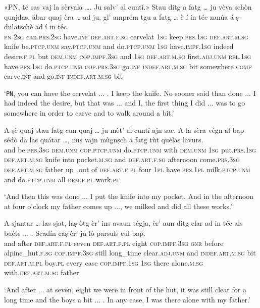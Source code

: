 \begin{linenumbers}
	\gll «PN, té sas vaj la sèrvala …. Ju salv’ al cuntí.»  Stau ditg a fatg … ju vèva schòn quajdas, ábar quaj èra … ad ju,  gl’ amprém tgu a fatg … è í in téc zanúa á ṣ-dulatschè ad í in téc.   \\
	\textsc{pn} \textsc{2sg} can.\textsc{prs.2sg} have.\textsc{inf} \textsc{def.art.f.sg} cervelat {} \textsc{1sg} keep.\textsc{prs.1sg} \textsc{def.art.m.sg} knife be.\textsc{ptcp.unm} say.\textsc{ptcp.unm} and do.\textsc{ptcp.unm} {} \textsc{1sg} have.\textsc{impf.1sg} indeed desire.\textsc{f.pl} but \textsc{dem.unm} \textsc{cop.impf.3sg} {} and \textsc{1sg} \textsc{def.art.m.sg} first.\textsc{adj.unm} \textsc{rel.1sg} have.\textsc{prs.1sg} do.\textsc{ptcp.unm} {} \textsc{cop.prs.3sg} go.\textsc{inf} i\textsc{ndef.art.m.sg} bit somewhere \textsc{comp} carve.\textsc{inf} and go.\textsc{inf} \textsc{indef.art.m.sg} bit  \\
\end{linenumbers}
\medskip
\glt `\texttt{PN}, you can have the cervelat ... . I keep the knife. No sooner said than done ... I had indeed the desire, but that was ... and I, the first thing I did ... was to go somewhere in order to carve and to walk around a bit.'
\medskip

\begin{linenumbers}
	\gll  A ṣè quaj stau fatg cun quaj … ju mèt’ al cuntí ajn sac. A la sèra végn al bap sédò da las quátar …, nuṣ vajn mùgnṣch a fatg tùt quèlas lavurs.\\
	and be.\textsc{prs.3sg} \textsc{dem.unm} \textsc{cop.ptcp.unm} do.\textsc{ptcp.unm} with \textsc{dem.unm} {} \textsc{1sg} put.\textsc{prs.1sg} \textsc{def.art.m.sg} knife into pocket.\textsc{m.sg} and \textsc{def.art.f.sg} afternoon come.\textsc{prs.3sg} \textsc{def.art.m.sg} father up\_out of \textsc{def.art.f.pl} four {} \textsc{1pl} have.\textsc{prs.1pl} milk.\textsc{ptcp.unm} and do.\textsc{ptcp.unm} all \textsc{dem.f.pl} work.\textsc{pl}   \\
\end{linenumbers}
\medskip
\glt `And then this was done ... I put the knife into my pocket. And in the afternoon at four o'clock my father comes up ..., we milked and did all these works.'
\medskip

\begin{linenumbers}
	\gll A sjantar … las sjat, laṣ òtg èr’ ins avaun tégja, èr’ aun ditg clar ad in téc als buéts\footnotemark{} ... . Scadín caṣ èr’ ju lò parsuls cul bap.   \\
	and after {} \textsc{def.art.f.pl} seven \textsc{def.art.f.pl} eight \textsc{cop.impf.3sg} \textsc{gnr} before alpine\_hut.\textsc{f.sg} \textsc{cop.impf.3sg} still long\_time clear.\textsc{adj.unm} and \textsc{indef.art.m.sg} bit \textsc{def.art.m.pl} boy.\textsc{pl} {} {} every case \textsc{cop.impf.1sg} \textsc{1sg} there alone.\textsc{m.sg} with.\textsc{def.art.m.sg} father\\
\end{linenumbers}
\medskip
\glt `And after ... at seven, eight we were in front of the hut, it was still clear for a long time and the boys a bit ... . In any case, I was there alone with my father.'
\medskip

